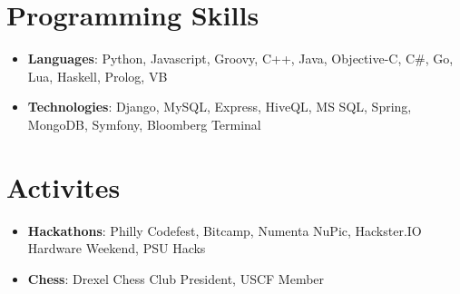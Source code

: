 \documentclass[letterpaper,11pt]{article}
\newcommand{\resumeItem}[2]{
  \item\small{
    \textbf{#1}{: #2 \vspace{-2pt}}
  }
}
\newcommand{\resumeSubItem}[2]{\resumeItem{#1}{#2}\vspace{-4pt}}
\newcommand{\resumeSubHeadingListStart}{\begin{itemize}[leftmargin=*]}
\newcommand{\resumeSubHeadingListEnd}{\end{itemize}}
\begin{document}
\section{Programming Skills}
 \resumeSubHeadingListStart
    \resumeSubItem{Languages}
      {Python, Javascript, Groovy, C++, Java, Objective-C, C\#, Go, Lua, Haskell, Prolog, VB}
    \resumeSubItem{Technologies}
      {Django, MySQL, Express, HiveQL, MS SQL, Spring, MongoDB, Symfony, Bloomberg Terminal}
 \resumeSubHeadingListEnd

 \section{Activites}
  \resumeSubHeadingListStart
    \resumeSubItem{Hackathons}
      {Philly Codefest, Bitcamp, Numenta NuPic, Hackster.IO Hardware Weekend, PSU Hacks}
    \resumeSubItem{Chess}
      {Drexel Chess Club President, USCF Member}
  \resumeSubHeadingListEnd


\end{document}
